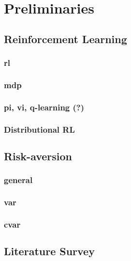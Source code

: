 \chapter{Preliminaries}\label{ch:prelim}



\section{Reinforcement Learning}

\subsection{rl}

\subsection{mdp}

\subsection{pi, vi, q-learning (?)}

\subsection{Distributional RL}



\section{Risk-aversion}

\subsection{general}

\subsection{var}

\subsection{cvar}


\section{Literature Survey}


